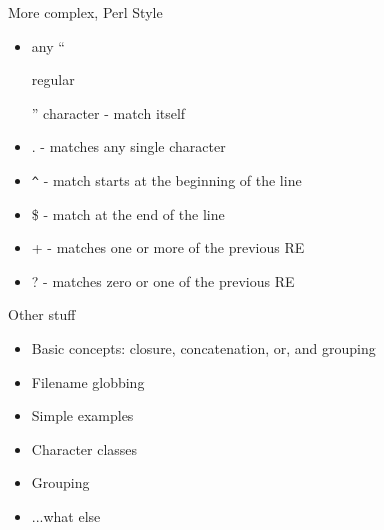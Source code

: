 \documentclass[ps,colorBG,contemporain]{prosper}
\begin{document}
\begin{slide}{More complex, Perl Style}\begin{itemize}
\item any ``\begin{em}regular\end{em}'' character - match itself
\item . - matches any single character
\item \verb#^# - match starts at the beginning of the line
\item \$ - match at the end of the line
\item + - matches one or more of the previous RE
\item ? - matches zero or one of the previous RE
\end{itemize}
\end{slide}

\begin{slide}{Other stuff}\begin{itemize}
\item Basic concepts: closure, concatenation, or, and grouping
\item Filename globbing
\item Simple examples
\item Character classes
\item Grouping
\item ...what else
\end{itemize}
\end{slide}
\end{document}
